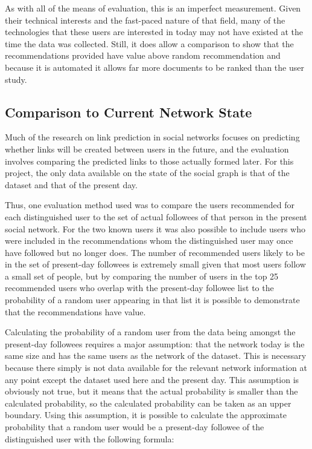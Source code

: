 As with all of the means of evaluation, this is an imperfect measurement. Given their technical interests and the fast-paced nature of that field, many of the technologies that these users are interested in today may not have existed at the time the data was collected. Still, it does allow a comparison to show that the recommendations provided have value above random recommendation and because it is automated it allows far more documents to be ranked than the user study.



\subsection{Comparison to Current Network State}
\label{sec:ComparisonToCurrentNetwork}

Much of the research on link prediction in social networks focuses on predicting whether links will be created between users in the future, and the evaluation involves comparing the predicted links to those actually formed later. For this project, the only data available on the state of the social graph is that of the dataset and that of the present day.

Thus, one evaluation method used was to compare the users recommended for each distinguished user to the set of actual followees of that person in the present social network. For the two known users it was also possible to include users who were included in the recommendations whom the distinguished user may once have followed but no longer does. The number of recommended users likely to be in the set of present-day followees is extremely small given that most users follow a small set of people, but by comparing the number of users in the top 25 recommended users who overlap with the present-day followee list to the probability of a random user appearing in that list it is possible to demonstrate that the recommendations have value.

Calculating the probability of a random user from the data being amongst the present-day followees requires a major assumption: that the network today is the same size and has the same users as the network of the dataset. This is necessary because there simply is not data available for the relevant network information at any point except the dataset used here and the present day. This assumption is obviously not true, but it means that the actual probability is smaller than the calculated probability, so the calculated probability can be taken as an upper boundary. Using this assumption, it is possible to calculate the approximate probability that a random user would be a present-day followee of the distinguished user with the following formula:


